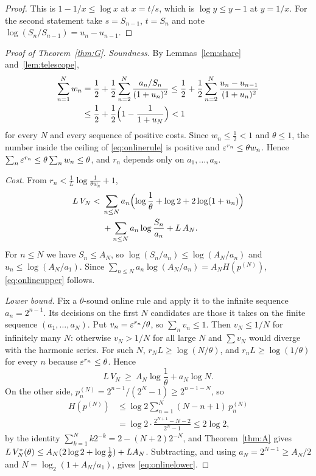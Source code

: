 \begin{proof}
This is $1-1/x\le\log x$ at $x=t/s$, which is $\log y\le y-1$ at $y=1/x$. For the second statement take $s=S_{n-1}$, $t=S_{n}$ and note $\log(S_{n}/S_{n-1})=u_{n}-u_{n-1}$.
\end{proof}

\begin{proof}[Proof of Theorem~\ref{thm:G}]
\emph{Soundness.} By Lemmas~\ref{lem:share} and~\ref{lem:telescope},
\[
\begin{aligned}
\sum_{n=1}^{N}w_{n}&=\frac12+\frac12\sum_{n=2}^{N}\frac{a_{n}/S_{n}}{(1+u_{n})^{2}}\le\frac12+\frac12\sum_{n=2}^{N}\frac{u_{n}-u_{n-1}}{(1+u_{n})^{2}}\\
&\le\frac12+\frac12\Bigl(1-\frac1{1+u_{N}}\Bigr)<1
\end{aligned}
\]
for every $N$ and every sequence of positive costs. Since $w_{n}\le\frac12<1$ and $\theta\le1$, the number inside the ceiling of \eqref{eq:onlinerule} is positive and $\varepsilon^{r_{n}}\le\theta w_{n}$. Hence $\sum_{n}\varepsilon^{r_{n}}\le\theta\sum_{n}w_{n}\le\theta$, and $r_{n}$ depends only on $a_{1},\dots,a_{n}$.

\emph{Cost.} From $r_{n}<\frac1L\log\frac1{\theta w_{n}}+1$,
\[
\begin{aligned}
L\,V_{N}<{}&\sum_{n\le N}a_{n}\Bigl(\log\frac1\theta+\log2+2\log(1+u_{n})\Bigr)\\
&+\sum_{n\le N}a_{n}\log\frac{S_{n}}{a_{n}}+L\,A_{N}.
\end{aligned}
\]
For $n\le N$ we have $S_{n}\le A_{N}$, so $\log(S_{n}/a_{n})\le\log(A_{N}/a_{n})$ and $u_{n}\le\log(A_{N}/a_{1})$. Since $\sum_{n\le N}a_{n}\log(A_{N}/a_{n})=A_{N}H(p^{(N)})$, \eqref{eq:onlineupper} follows.

\emph{Lower bound.} Fix a $\theta$-sound online rule and apply it to the infinite sequence $a_{n}=2^{n-1}$. Its decisions on the first $N$ candidates are those it takes on the finite sequence $(a_{1},\dots,a_{N})$. Put $v_{n}=\varepsilon^{r_{n}}/\theta$, so $\sum_{n}v_{n}\le1$. Then $v_{N}\le1/N$ for infinitely many $N$: otherwise $v_{N}>1/N$ for all large $N$ and $\sum v_{N}$ would diverge with the harmonic series. For such $N$, $r_{N}L\ge\log(N/\theta)$, and $r_{n}L\ge\log(1/\theta)$ for every $n$ because $\varepsilon^{r_{n}}\le\theta$. Hence
\[
L\,V_{N}\ \ge\ A_{N}\log\frac1\theta+a_{N}\log N .
\]
On the other side, $p^{(N)}_{n}=2^{n-1}/(2^{N}-1)\ge2^{n-1-N}$, so
\[
\begin{aligned}
H(p^{(N)})&\le\log2\sum_{n=1}^{N}(N-n+1)\,p^{(N)}_{n}\\
&=\log2\cdot\frac{2^{N+1}-N-2}{2^{N}-1}\le2\log2,
\end{aligned}
\]
by the identity $\sum_{k=1}^{N}k2^{-k}=2-(N+2)2^{-N}$, and Theorem~\ref{thm:A} gives $L\,V^{*}_{N}(\theta)\le A_{N}(2\log2+\log\frac1\theta)+LA_{N}$. Subtracting, and using $a_{N}=2^{N-1}\ge A_{N}/2$ and $N=\log_{2}(1+A_{N}/a_{1})$, gives \eqref{eq:onlinelower}.
\end{proof}

